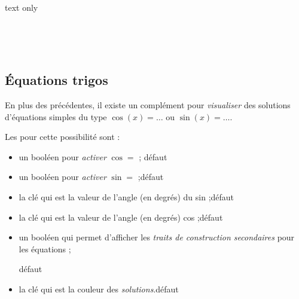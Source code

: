 \begin{PresCodeSortiePL}{text only}
\begin{center}
\begin{tikzpicture}[line join=bevel]
	\CercleTrigo[Rayon=2.5,AffValeurs=false,Decal=8pt]
\end{tikzpicture}
~~~~
\begin{tikzpicture}[line join=bevel]
	\CercleTrigo[Rayon=2.5,AffAngles=false]
\end{tikzpicture}
~~~~
\begin{tikzpicture}[line join=bevel]
	\CercleTrigo[Rayon=2.5,MoinsPi=false,CouleurFond=orange!15,TailleValeurs=\tiny,ValeursTan]
\end{tikzpicture}
\end{center}
\end{PresCodeSortiePL}

\subsection{Équations trigos}

\begin{noteblock}
En plus des  précédentes, il existe un complément pour \textit{visualiser} des solutions d'équations simples du type $\cos(x)=\ldots$ ou $\sin(x)=\ldots$.
\end{noteblock}

\begin{cautionblock}
Les  pour cette possibilité sont :

\begin{itemize}
	\item un booléen  pour \textit{activer} \og $\cos=$ \fg; \hfill{}défaut 
	\item un booléen  pour \textit{activer} \og $\sin=$ \fg;\hfill{}défaut 
	\item la clé  qui est la valeur de l'angle (en degrés) du sin ;\hfill{}défaut 
	\item la clé  qui est la valeur de l'angle (en degrés) cos ;\hfill{}défaut 
	\item {} un booléen  qui permet d'afficher les \textit{traits de construction secondaires} pour les équations ;
	
	\hfill{}défaut 
	\item la clé  qui est la couleur des \textit{solutions}.\hfill{}défaut 
\end{itemize}
\vspace*{-\baselineskip}\leavevmode
\end{cautionblock}

